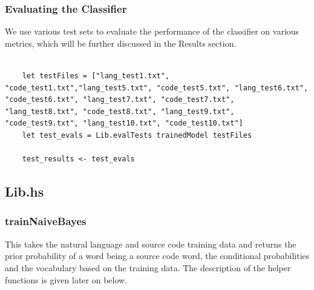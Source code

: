 \documentclass[12pt]{scrreprt}
\begin{document}
\subsubsection{Evaluating the Classifier}

We use various test sets to evaluate the performance of the classifier on various metrics, which will be further discussed in the Results section. 

\begin{verbatim}

    let testFiles = ["lang_test1.txt", "code_test1.txt","lang_test5.txt", "code_test5.txt", "lang_test6.txt", "code_test6.txt", "lang_test7.txt", "code_test7.txt", "lang_test8.txt", "code_test8.txt", "lang_test9.txt", "code_test9.txt", "lang_test10.txt", "code_test10.txt"]
    let test_evals = Lib.evalTests trainedModel testFiles

    test_results <- test_evals
   \end{verbatim}
   



\subsection{Lib.hs}

\subsubsection{trainNaiveBayes}

This takes the natural language and source code training data and returns the prior probability of a word being a source code word, the conditional probabilities and the vocabulary based on the training data. The description of the helper functions is given later on below. 
\end{document}
